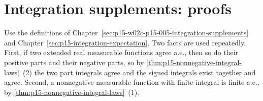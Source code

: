 \section{Integration supplements: proofs}
\label{sec:annex-p15-w02c-p15-005-integration-supplements}

Use the definitions of
Chapter~\ref{sec:p15-w02c-p15-005-integration-supplements} and
Chapter~\ref{sec:p15-integration-expectation}. Two facts are used
repeatedly. First, if two extended real measurable functions agree a.e.,
then so do their positive parts and their negative parts, so by
\cref{thm:p15-nonnegative-integral-laws}~(2) the two part integrals
agree and the signed integrals exist together and agree. Second, a
nonnegative measurable function with finite integral is finite a.e., by
\cref{thm:p15-nonnegative-integral-laws}~(1).

